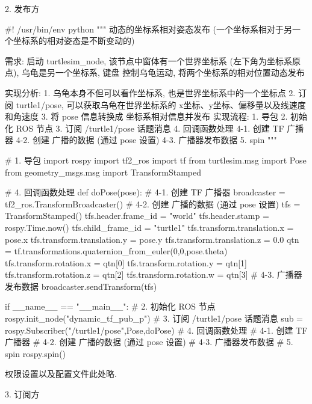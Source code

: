 \documentclass[openany, fontset=windowsold]{ctexbook}
\theoremstyle{kaiti}
\theoremstyle{normal}
\begin{document}
2. 发布方

\begin{python}
  #! /usr/bin/env python
  """  
      动态的坐标系相对姿态发布 (一个坐标系相对于另一个坐标系的相对姿态是不断变动的)

      需求: 启动 turtlesim_node, 该节点中窗体有一个世界坐标系 (左下角为坐标系原点), 乌龟是另一个坐标系, 键盘
      控制乌龟运动, 将两个坐标系的相对位置动态发布

      实现分析:
          1. 乌龟本身不但可以看作坐标系, 也是世界坐标系中的一个坐标点
          2. 订阅 turtle1/pose, 可以获取乌龟在世界坐标系的 x坐标、y坐标、偏移量以及线速度和角速度
          3. 将 pose 信息转换成 坐标系相对信息并发布
      实现流程:
          1. 导包
          2. 初始化 ROS 节点
          3. 订阅 /turtle1/pose 话题消息
          4. 回调函数处理
              4-1. 创建 TF 广播器
              4-2. 创建 广播的数据 (通过 pose 设置)
              4-3. 广播器发布数据
          5. spin
  """

  # 1. 导包
  import rospy
  import tf2_ros
  import tf
  from turtlesim.msg import Pose
  from geometry_msgs.msg import TransformStamped

  #     4. 回调函数处理
  def doPose(pose):
      #         4-1. 创建 TF 广播器
      broadcaster = tf2_ros.TransformBroadcaster()
      #         4-2. 创建 广播的数据 (通过 pose 设置)
      tfs = TransformStamped()
      tfs.header.frame_id = "world"
      tfs.header.stamp = rospy.Time.now()
      tfs.child_frame_id = "turtle1"
      tfs.transform.translation.x = pose.x
      tfs.transform.translation.y = pose.y
      tfs.transform.translation.z = 0.0
      qtn = tf.transformations.quaternion_from_euler(0,0,pose.theta)
      tfs.transform.rotation.x = qtn[0]
      tfs.transform.rotation.y = qtn[1]
      tfs.transform.rotation.z = qtn[2]
      tfs.transform.rotation.w = qtn[3]
      #         4-3. 广播器发布数据
      broadcaster.sendTransform(tfs)

  if __name__ == "__main__":
      # 2. 初始化 ROS 节点
      rospy.init_node("dynamic_tf_pub_p")
      # 3. 订阅 /turtle1/pose 话题消息
      sub = rospy.Subscriber("/turtle1/pose",Pose,doPose)
      #     4. 回调函数处理
      #         4-1. 创建 TF 广播器
      #         4-2. 创建 广播的数据 (通过 pose 设置)
      #         4-3. 广播器发布数据
      #     5. spin
      rospy.spin()
\end{python}

权限设置以及配置文件此处略.

3. 订阅方
\end{document}
